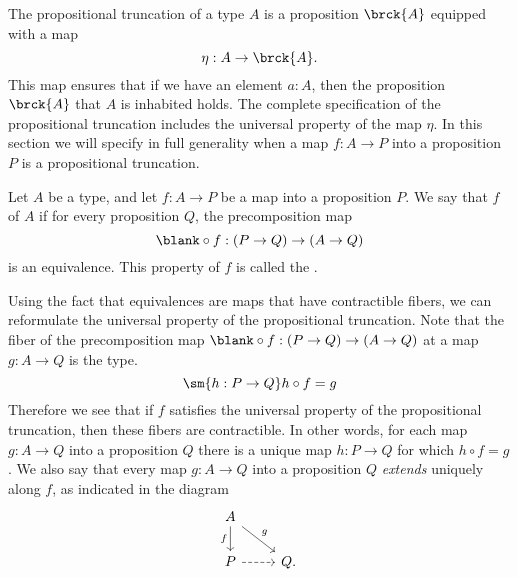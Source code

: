 The propositional truncation of a type $A$ is a proposition $\brck{A}$ equipped with a map
\begin{equation*}
  \eta:A\to \brck{A}.
\end{equation*}
This map ensures that if we have an element $a:A$, then the proposition $\brck{A}$ that $A$ is inhabited holds. The complete specification of the propositional truncation includes the universal property of the map $\eta$. In this section we will specify in full generality when a map $f:A\to P$ into a proposition $P$ is a propositional truncation.

\begin{defn}
Let $A$ be a type, and let $f:A\to P$ be a map into a proposition $P$. We say that $f$  of $A$ if for every proposition $Q$, the precomposition map
\begin{equation*}
\blank\circ f:(P\to Q)\to (A\to Q)
\end{equation*}
is an equivalence. This property of $f$ is called the .
\end{defn}

\begin{rmk}\label{ex:prop_equiv}
  Using the fact that equivalences are maps that have contractible fibers, we can reformulate the universal property of the propositional truncation. Note that the fiber of the precomposition map $\blank\circ f:(P\to Q) \to (A \to Q)$ at a map $g:A\to Q$ is the type.
  \begin{equation*}
    \sm{h:P\to Q}h\circ f=g
  \end{equation*}
  Therefore we see that if $f$ satisfies the universal property of the propositional truncation, then these fibers are contractible. In other words, for each map $g:A\to Q$ into a proposition $Q$ there is a unique map $h:P\to Q$ for which $h\circ f=g$. We also say that every map $g:A\to Q$ into a proposition $Q$ \emph{extends} uniquely along $f$, as indicated in the diagram
  \begin{equation*}
    \begin{tikzcd}
      A \arrow[d,swap,"f"] \arrow[dr,"g"] \\
      P \arrow[r,dashed] & Q.
    \end{tikzcd}
  \end{equation*}
\end{rmk}

